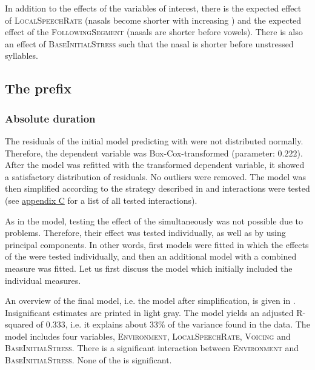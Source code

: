 In addition to the effects of the variables of interest, there is the expected effect of \textsc{LocalSpeechRate} (nasals become shorter with increasing ) and the expected effect of the \textsc{FollowingSegment} (nasals are shorter before vowels). There is also an effect of \textsc{BaseInitialStress} such that the nasal is shorter before unstressed syllables.

\subsection{The prefix } \label{corpus results dis}


\subsubsection{Absolute duration}

The residuals of the initial model predicting  with  were not distributed normally. Therefore, the dependent variable was Box-Cox-transformed (parameter:  $0.222$). After the model was refitted with the transformed dependent variable, it showed a satisfactory distribution of residuals. No outliers were removed. The model was then simplified according to the strategy described in   and interactions were tested (see \hyperref[Appendix C: Summaries of tested interactions in corpus study]{appendix C} for a list of all tested interactions).

As in the model, testing the effect of the  simultaneously was not possible due to  problems. Therefore, their effect was tested individually, as well as by using principal components. In other words, first models were fitted in which the effects of the  were tested individually, and then an additional model with a combined  measure was fitted. 
 Let us first discuss the model which initially included the individual measures.

An overview of the final model, i.e. the model after simplification, is given in . Insignificant estimates are printed in light gray. The model yields an adjusted R-squared of  0.333, i.e. it explains about 33\% of the variance found in the data. The model includes four variables, \textsc{Environment}, \textsc{LocalSpeechRate}, \textsc{Voicing} and \textsc{BaseInitialStress}. There is a significant interaction between \textsc{Environment} and \textsc{BaseInitialStress}. None of the  is significant.



